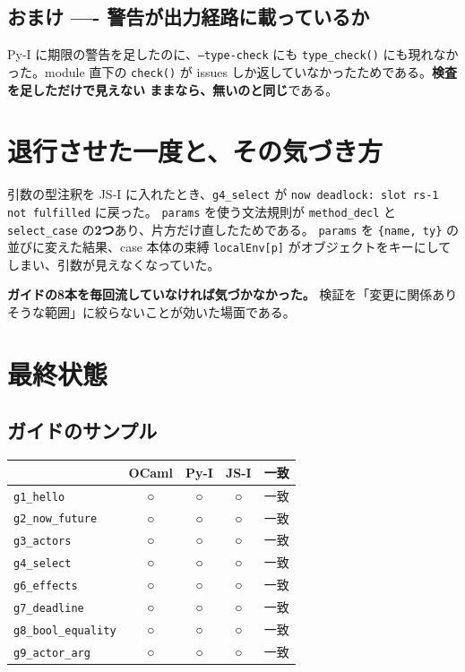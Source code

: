 \documentclass[11pt,a4paper]{ltjsarticle}
\newcommand{\ok}{\textcolor{okgreen}{\textbf{○}}}
\begin{document}
\subsection{おまけ ---- 警告が出力経路に載っているか}

Py-I に期限の警告を足したのに、\texttt{--type-check} にも
\texttt{type\_check()} にも現れなかった。module 直下の \texttt{check()} が
issues しか返していなかったためである。\textbf{検査を足しただけで見えない
ままなら、無いのと同じ}である。

\section{退行させた一度と、その気づき方}

引数の型注釈を JS-I に入れたとき、\texttt{g4\_select} が
\texttt{now deadlock: slot rs-1 not fulfilled} に戻った。
\texttt{params} を使う文法規則が \texttt{method\_decl} と
\texttt{select\_case} の\textbf{2つ}あり、片方だけ直したためである。
\texttt{params} を \verb|{name, ty}| の並びに変えた結果、case 本体の束縛
\texttt{localEnv[p]} がオブジェクトをキーにしてしまい、引数が見えなくなっていた。

\textbf{ガイドの8本を毎回流していなければ気づかなかった。}
検証を「変更に関係ありそうな範囲」に絞らないことが効いた場面である。

\section{最終状態}

\subsection{ガイドのサンプル}

\begin{center}
\small
\begin{tabular}{@{}lccc l@{}}
\toprule
 & OCaml & Py-I & JS-I & 一致 \\
\midrule
\texttt{g1\_hello} & \ok & \ok & \ok & 一致 \\
\texttt{g2\_now\_future} & \ok & \ok & \ok & 一致 \\
\texttt{g3\_actors} & \ok & \ok & \ok & 一致 \\
\texttt{g4\_select} & \ok & \ok & \ok & 一致 \\
\texttt{g6\_effects} & \ok & \ok & \ok & 一致 \\
\texttt{g7\_deadline} & \ok & \ok & \ok & 一致 \\
\texttt{g8\_bool\_equality} & \ok & \ok & \ok & 一致 \\
\texttt{g9\_actor\_arg} & \ok & \ok & \ok & 一致 \\
\bottomrule
\end{tabular}
\end{center}
\end{document}
